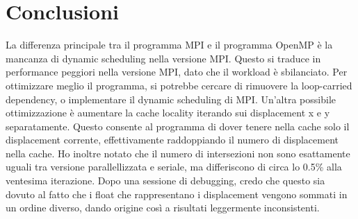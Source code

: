 \documentclass[a4paper,11pt, twoside]{report}
\begin{document}
\section*{Conclusioni}
La differenza principale tra il programma MPI e il programma OpenMP è la mancanza di dynamic scheduling nella versione MPI.
Questo si traduce in performance peggiori nella versione MPI, dato che il workload è sbilanciato.
Per ottimizzare meglio il programma, si potrebbe cercare di rimuovere la loop-carried dependency, o implementare il dynamic scheduling di MPI.
Un'altra possibile ottimizzazione è aumentare la cache locality iterando sui displacement x e y separatamente.
Questo consente al programma di dover tenere nella cache solo il displacement corrente, effettivamente raddoppiando il numero di displacement nella cache.
Ho inoltre notato che il numero di intersezioni non sono esattamente uguali tra versione parallellizzata e seriale, ma differiscono di circa lo 0.5\% alla ventesima iterazione. 
Dopo una sessione di debugging, credo che questo sia dovuto al fatto che i float che rappresentano i displacement vengono sommati in un ordine diverso, dando origine così a risultati leggermente inconsistenti.
\printbibliography
\appendix
\end{document}
